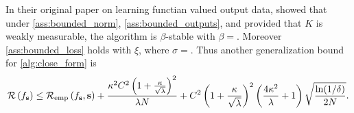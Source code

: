 In their original paper on learning functian valued output data,
\citet{kadri2015operator} showed that under \cref{ass:bounded_norm},
\cref{ass:bounded_outputs}, and provided that $K$ is weakly measurable, the
algorithm is $\beta$-stable with $\beta=$. Moreover \cref{ass:bounded_loss}
holds with $\xi$, where $\sigma=$.  Thus another generalization bound for
\cref{alg:close_form} is
\begin{dmath}
    \risk{f_{\seq{s}}} \le \riskemp{f_{\seq{s}}, \seq{s}}  + \frac{\kappa^2 C^2
    \left(1 + \frac{\kappa}{\sqrt{\lambda}} \right)^2 }{\lambda N} + C^2\left(
    1 + \frac{\kappa}{\sqrt{\lambda}} \right)^2\left( \frac{4\kappa^2}{\lambda}
    + 1 \right)\sqrt{\frac{\ln(1/\delta)}{2N}}.
\end{dmath}

